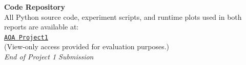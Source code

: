 \documentclass{article}
\begin{document}



\newpage
\thispagestyle{empty}
\begin{center}
    \vspace*{4cm}
    \Huge{\textbf{Code Repository}}\\[1cm]
    \Large{All Python source code, experiment scripts, and runtime plots used in both reports are available at:}\\[0.5cm]
    \Large{\href{https://drive.google.com/drive/folders/1z4sT0gWIyU-71sdMK3_u90aOcTGhf54Q?usp=sharing}{\texttt{AOA Project1}}}\\[1cm]
    \Large{(View-only access provided for evaluation purposes.)}\\[2cm]
    \Large{\textit{End of Project 1 Submission}}
\end{center}
\end{document}

